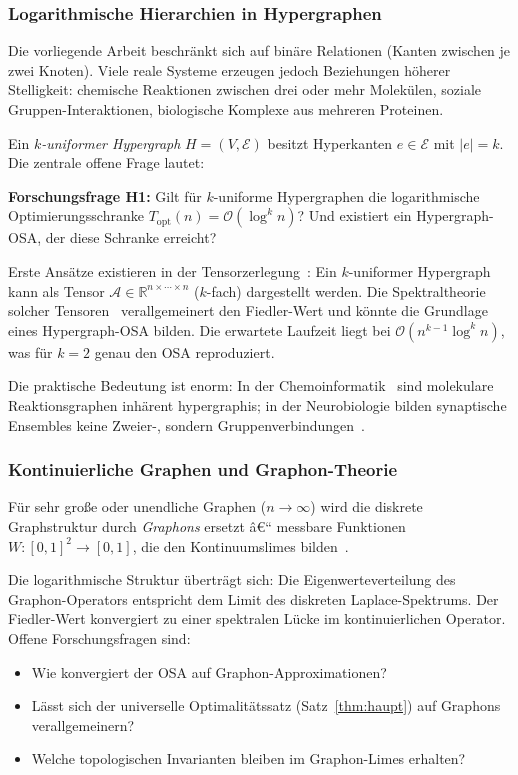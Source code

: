 ﻿\documentclass[12pt,a4paper,twoside]{article}
\theoremstyle{definition}
\theoremstyle{plain}
\theoremstyle{remark}
\begin{document}
\subsubsection{Logarithmische Hierarchien in Hypergraphen}

Die vorliegende Arbeit beschränkt sich auf binäre Relationen
(Kanten zwischen je zwei Knoten).  Viele reale Systeme erzeugen
jedoch Beziehungen höherer Stelligkeit: chemische Reaktionen
zwischen drei oder mehr Molekülen, soziale Gruppen-Interaktionen,
biologische Komplexe aus mehreren Proteinen.

Ein \emph{$k$-uniformer Hypergraph} $H = (V, \mathcal{E})$ besitzt
Hyperkanten $e \in \mathcal{E}$ mit $|e| = k$.  Die zentrale
offene Frage lautet:

\textbf{Forschungsfrage H1:} Gilt für $k$-uniforme Hypergraphen
die logarithmische Optimierungsschranke
$T_{\text{opt}}(n) = \mathcal{O}(\log^k n)$?
Und existiert ein Hypergraph-OSA, der diese Schranke erreicht?

Erste Ansätze existieren in der Tensorzerlegung~\cite{Kolda2009}:
Ein $k$-uniformer Hypergraph kann als Tensor $\mathcal{A} \in
\mathbb{R}^{n \times \cdots \times n}$ ($k$-fach) dargestellt werden.
Die Spektraltheorie solcher Tensoren~\cite{Qi2005} verallgemeinert
den Fiedler-Wert und könnte die Grundlage eines Hypergraph-OSA
bilden.  Die erwartete Laufzeit liegt bei
$\mathcal{O}(n^{k-1} \log^k n)$, was für $k=2$ genau den OSA
reproduziert.

Die praktische Bedeutung ist enorm: In der Chemoinformatik~\cite{Bertz1981}
sind molekulare Reaktionsgraphen inhärent hypergraphis; in der
Neurobiologie bilden synaptische Ensembles keine Zweier-,
sondern Gruppenverbindungen~\cite{Reimann2017}.

\subsubsection{Kontinuierliche Graphen und Graphon-Theorie}

Für sehr große oder unendliche Graphen ($n \to \infty$)
wird die diskrete Graphstruktur durch \emph{Graphons} ersetzt â€“
messbare Funktionen $W: [0,1]^2 \to [0,1]$, die den
Kontinuumslimes bilden~\cite{Lovasz2012}.

Die logarithmische Struktur überträgt sich: Die Eigenwerteverteilung
des Graphon-Operators entspricht dem Limit des diskreten
Laplace-Spektrums.  Der Fiedler-Wert konvergiert zu einer
spektralen Lücke im kontinuierlichen Operator.  Offene
Forschungsfragen sind:
\begin{itemize}
  \item Wie konvergiert der OSA auf Graphon-Approximationen?
  \item Lässt sich der universelle Optimalitätssatz (Satz~\ref{thm:haupt})
        auf Graphons verallgemeinern?
  \item Welche topologischen Invarianten bleiben im
        Graphon-Limes erhalten?
\end{itemize}
\end{document}

